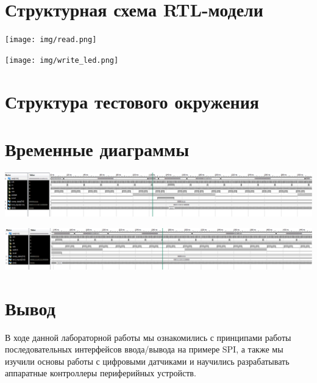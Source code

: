 



\section{Структурная схема RTL-модели}
\begin{centering}
\newpage
\texttt{[image: img/read.png]}
\newpage

\texttt{[image: img/write\_led.png]}
\end{centering}

\section{Структура тестового окружения}


\section{Временные диаграммы}
\begin{centering}
\includegraphics[width=\textwidth]{img/graph1.png}

\includegraphics[width=\textwidth]{img/graph2.png}
\end{centering}
\section{Вывод}
В ходе данной лабораторной работы мы ознакомились с принципами работы последовательных
интерфейсов ввода/вывода на примере SPI, а также мы изучили основы работы с
цифровыми датчиками и научились разрабатывать аппаратные контроллеры периферийных
устройств.

